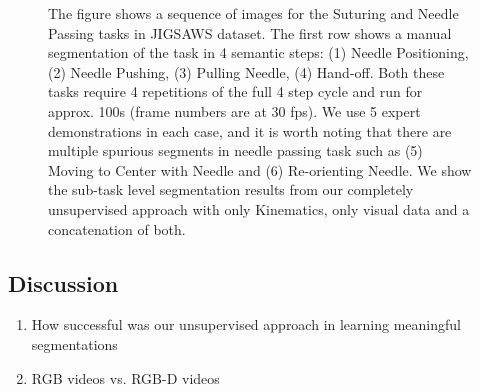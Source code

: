 \begin{figure}[!ht]
	\caption{ The figure shows a sequence of images for the Suturing and Needle Passing tasks in JIGSAWS dataset\cite{gao2014jigsaws}.
The first row shows a manual segmentation of the task in 4 semantic steps: (1) Needle Positioning, (2) Needle Pushing, (3) Pulling Needle, (4) Hand-off.
Both these tasks require 4 repetitions of the full 4 step cycle and run for approx. 100s (frame numbers are at 30 fps). 
We use 5 expert demonstrations in each case, and it is worth noting that there are multiple spurious segments in needle passing task such as (5) Moving to Center with Needle and (6) Re-orienting Needle. We show the sub-task level segmentation results from our completely unsupervised approach with only Kinematics, only visual data and a concatenation of both.}
	\label{fig:sensitivityAnalysis}
	\vspace{-15pt}
\end{figure}


\subsection{Discussion}
\begin{enumerate}
\item How successful was our unsupervised approach in learning meaningful segmentations
\item RGB videos vs. RGB-D videos
\end{enumerate}

